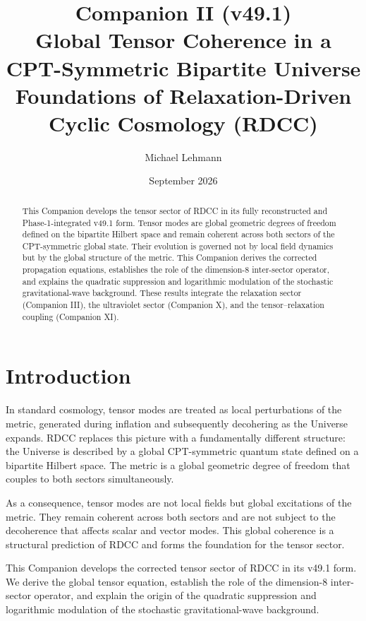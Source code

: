 \documentclass[11pt,a4paper]{article}
\title{\textbf{Companion II (v49.1)}\\[0.2cm]
\textbf{Global Tensor Coherence in a CPT-Symmetric Bipartite Universe}\\[0.2cm]
\large Foundations of Relaxation-Driven Cyclic Cosmology (RDCC)}
\author[1]{Michael Lehmann}
\affil[1]{\small Independent Researcher, Relaxation-Driven Cyclic Cosmology (RDCC)\\
\texttt{mi.lehmann@gmx.de}}
\date{September 2026}
\begin{document}
\maketitle


\begin{abstract}
This Companion develops the tensor sector of RDCC in its fully reconstructed
and Phase-1-integrated v49.1 form. Tensor modes are global geometric degrees of
freedom defined on the bipartite Hilbert space and remain coherent across both
sectors of the CPT-symmetric global state. Their evolution is governed not by
local field dynamics but by the global structure of the metric. This Companion
derives the corrected propagation equations, establishes the role of the
dimension-8 inter-sector operator, and explains the quadratic suppression and
logarithmic modulation of the stochastic gravitational-wave background. These
results integrate the relaxation sector (Companion III), the ultraviolet sector
(Companion X), and the tensor–relaxation coupling (Companion XI).
\end{abstract}

\tableofcontents
\newpage

\section{Introduction}

In standard cosmology, tensor modes are treated as local perturbations of the
metric, generated during inflation and subsequently decohering as the Universe
expands. RDCC replaces this picture with a fundamentally different structure:
the Universe is described by a global CPT-symmetric quantum state defined on a
bipartite Hilbert space. The metric is a global geometric degree of freedom
that couples to both sectors simultaneously.

As a consequence, tensor modes are not local fields but global excitations of
the metric. They remain coherent across both sectors and are not subject to the
decoherence that affects scalar and vector modes. This global coherence is a
structural prediction of RDCC and forms the foundation for the tensor sector.

This Companion develops the corrected tensor sector of RDCC in its v49.1 form.
We derive the global tensor equation, establish the role of the dimension-8
inter-sector operator, and explain the origin of the quadratic suppression and
logarithmic modulation of the stochastic gravitational-wave background.
\end{document}
